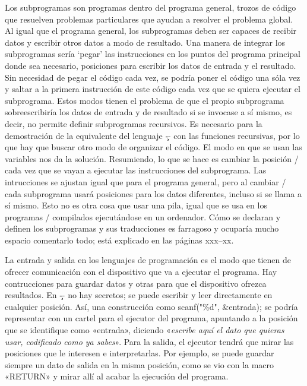 Los subprogramas son programas dentro del programa general, trozos de código que resuelven problemas
particulares que ayudan a resolver el problema global. Al igual que el programa general, los
subprogramas deben ser capaces de recibir datos y escribir otros datos a modo de resultado. Una
manera de integrar los subprogramas sería ‘pegar’ las instrucciones en los puntos del programa
principal donde sea necesario, posiciones para escribir los datos de entrada y el resultado. Sin
necesidad de pegar el código cada vez, se podría poner el código una sóla vez y saltar a la primera
instrucción de este código cada vez que se quiera ejecutar el subprograma. Estos modos tienen el
problema de que el propio subprograma sobreescribiría los datos de entrada y de resultado si se
invocase a sí mismo, es decir, no permite definir subprogramas recursivos. Es necesario para la
demostración de la equivalente del lenguaje \c-- con las funciones recursivas, por lo que hay que
buscar otro modo de organizar el código. El modo en que se usan las variables nos da la
solución. Resumiendo, lo que se hace es cambiar la posición \top/ cada vez que se vayan a ejecutar
las instrucciones del subprograma. Las intrucciones se ajustan igual que para el programa general,
pero al cambiar \top/ cada subprograma usará posiciones para los datos diferentes, incluso si se
llama a sí mismo. Esto no es otra cosa que usar una pila, igual que se usa en los programas \C/
compilados ejecutándose en un ordenador. Cómo se declaran y definen los subprogramas y sus
traducciones es farragoso y ocuparía mucho espacio comentarlo todo; está explicado en las páginas
xxx--xx.

La entrada y salida en los lenguajes de programación es el modo que tienen de ofrecer comunicación
con el dispositivo que va a ejecutar el programa. Hay contrucciones para guardar datos y otras para
que el dispositivo ofrezca resultados. En \c-- no hay secretos; se puede escribir y leer
directamente en cualquier posición. Así, una construcción como
\encaje
\fcode scanf("\%d", \&entrada);
\finencaje
se podría representar con un cartel para el ejecutor del programa, apuntando a la posición que se
identifique como «{\fcode entrada}», diciendo «{\it escribe aquí el dato que quieras usar, codificado como
ya sabes}». Para la salida, el ejecutor tendrá que mirar las posiciones que le interesen e
interpretarlas. Por ejemplo, se puede guardar siempre un dato de salida en la misma posición, como
se vio con la macro «{\fcode RETURN}» y mirar allí al acabar la ejecución del programa.
